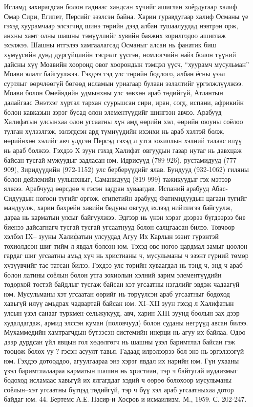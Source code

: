 Исламд захирагдсан болон гаднаас хандсан хүчийг ашиглан хоёрдугаар халиф Омар Сири, Египет, Персийг эзэлсэн байна. Харин гуравдугаар халиф Османы үе гэхэд хуурамчаар элсэгчид шинэ төрийн дээд албан тушаалуудад нэвтрэн орж, анхны хамт олны шашны тэмүүллийг хувийн баяжих зорилгодоо ашиглаж эхэлжээ. Шашны итгэлээ хамгаалагсад Османыг алсан нь фанатик биш хүмүүсийн дунд дургүйцлийн тэсрэлт үүсгэн, номлогчийн найз болон түүний дайсны хүү Моавийн хооронд овог хоорондын тэмцэл үүсч, “хуурамч мусульман” Моави ялалт байгуулжээ. Гэхдээ тэд улс төрийн бодлого, албан ёсны үзэл суртлыг өөрчлөөгүй бөгөөд исламын уриагаар булаан эзлэлтийг үргэлжлүүлжээ. Моави болон Омейядийн удмынхны улс зөвхөн араб төдийгүй, Атлантын далайгаас Энэтхэг хүртэл тархан суурьшсан сири, иран, согд, испани, африкийн болон кавказын зэрэг бусад олон элементүүдийг шингээн авчээ.
Арабууд Халифатын улсынхаа олон угсаатны хүн амд өөрийн хэл, өөрийн оюуны соёлоо тулган хүлээлгэж, эзлэгдсэн ард түмнүүдийн ихэнхи нь араб хэлтэй болж, өөрийнхөө хэлийг авч үлдсэн Персэд гэхэд л утга зохиолын хэлний талаас илүү нь араб болжээ.
Гэхдээ X зуун гэхэд Халифат овгуудын газар нутаг нь давхцаж байсан тусгай мужуудыг задласан юм. Идрисүүд (789-926), рустамидууд (777-909), Зиридүүдийн (972-1152) улс берберүүдийг ялав. Бундууд (932-1062) гиляны болон дейлемийн уулынхныг, Саманидууд (819-999) тажикуудыг гэх мэтээр ялжээ. Арабчууд өөрсдөө ч гэсэн задран хуваагдав. Испаний арабууд Абас-Сидуудын ногоон тугийг өргөж, египетийн арабууд Фатимидуудын цагаан тугийг мандуулж, харин бахрейн хавийн бедуны овгууд эхлээд нийтлэгээ байгуулж, дараа нь карматын улсыг байгуулжээ. Эдгээр нь үнэн хэрэг дээрээ бүгдээрээ бие биенээ дайсагнагч тусгай тусгай угсаатнууд болон салцгаасан билээ.
Товчоор хэлбэл IX– зууны Халифатын улсуудад Агуу Их Карлын эзэнт гүрэнтэй тохиолдсон шиг тийм л явдал болсон юм. Тэхэд өвс ногоо цардмал замыг цоолон гардаг шиг угсаатны амьд хүч нь христианы ч, мусульманы ч эзэнт гүрний төмөр хүзүүвчийг тас татсан билээ. Гэхдээ улс төрийн хуваагдал нь тэнд ч, энд ч араб болон латины соёлын болон утга зохиолын хэлний зарим элементүүдийн тодорхой төстэй байдлыг тусгаж байсан хэт угсаатны нэгдлийг эвдэж чадаагүй юм. Мусульманы хэт угсаатан өөрийг нь төрүүлсэн араб угсаатныг бодоход хавьгүй илүү амьдрах чадвартай байсан юм. XI–XII зуун гэхэд л Халифатын улсын үзэл санааг туркмен-сельжукууд, авч, харин XIII зуунд боолын зах дээр худалдагдаж, армид элссэн куман (половчууд) болон суданы негрүүд авсан билээ. Мухаммедийн хамтрагчдын бүтээсэн системийн инерци нь агуу их байлаа.
Одоо дээр дурдсан үйл явцын гол хөдөлгөгч нь шашны үзэл баримтлал байсан гэж тооцож болох уу ? гэсэн асуулт тавья. Гадаад илрэлээрээ бол энэ нь эргэлзээгүй юм. Гэхдээ дотооддоо, агуулгаараа энэ хэрэг явдал их нарийн юм. Гүн ухааны үзэл баримтлалаараа карматын шашин нь христиан, тэр ч байтугай иудаизмыг бодоход исламаас хавьгүй их ялгагддаг хэдий ч өөрөө болохоор мусульманы соёлын–хэт угсаатны бүтцэд төдийгүй, тэр ч бүү хэл араб угсаатныхаа дотор байдаг юм. 44. Бертемс А.Е. Насир-и Хосров и исмаилизм. М., 1959. С. 202-247.
